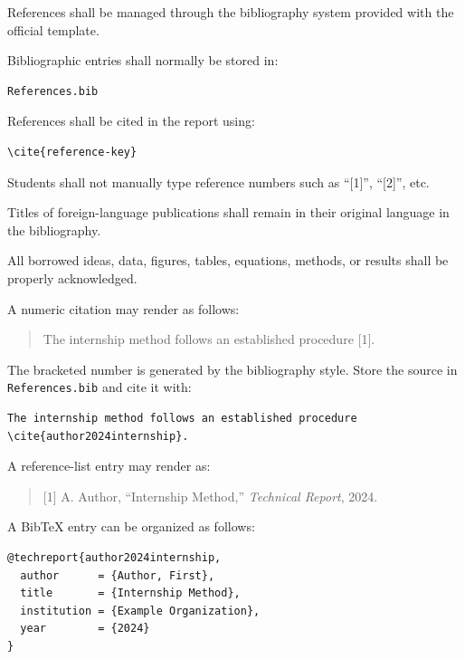 {References shall be managed through the bibliography system provided with
the official template.

Bibliographic entries shall normally be stored in:

\begin{verbatim}
References.bib
\end{verbatim}

References shall be cited in the report using:

\begin{verbatim}
\cite{reference-key}
\end{verbatim}

Students shall not manually type reference numbers such as ``[1]'',
``[2]'', etc.

Titles of foreign-language publications shall remain in their original
language in the bibliography.

All borrowed ideas, data, figures, tables, equations, methods, or results
shall be properly acknowledged.



A numeric citation may render as follows:

\begin{quote}
The internship method follows an established procedure [1].
\end{quote}

The bracketed number is generated by the bibliography style. Store
the source in \verb|References.bib| and cite it with:

\begin{verbatim}
The internship method follows an established procedure
\cite{author2024internship}.
\end{verbatim}

A reference-list entry may render as:

\begin{quote}
[1] A. Author, \textquotedblleft Internship Method,\textquotedblright
\textit{Technical Report}, 2024.
\end{quote}

A BibTeX entry can be organized as follows:

\begin{verbatim}
@techreport{author2024internship,
  author      = {Author, First},
  title       = {Internship Method},
  institution = {Example Organization},
  year        = {2024}
}
\end{verbatim}


}
